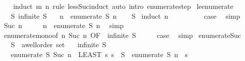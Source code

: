 \begin{isabellebody}
%
\isadelimproof
\ \ %
\endisadelimproof
%
\isatagproof
{}\isamarkupfalse%
\ {\isacharparenleft}induct\ m\ n\ rule{\isacharcolon}\ less{\isacharunderscore}Suc{\isacharunderscore}induct{\isacharparenright}\ {\isacharparenleft}auto\ intro{\isacharcolon}\ enumerate{\isacharunderscore}step{\isacharparenright}%
\endisatagproof
{\isafoldproof}%
%
\isadelimproof
\isanewline
%
\endisadelimproof
\isanewline
{}\isamarkupfalse%
\ le{\isacharunderscore}enumerate{\isacharcolon}\isanewline
\ \ \ S{\isacharcolon}\ {\isachardoublequoteopen}infinite\ S{\isachardoublequoteclose}\isanewline
\ \ \ {\isachardoublequoteopen}n\ {\isasymle}\ enumerate\ S\ n{\isachardoublequoteclose}\isanewline
%
\isadelimproof
\ \ %
\endisadelimproof
%
\isatagproof
{}\isamarkupfalse%
\ S\isanewline
{}\isamarkupfalse%
\ {\isacharparenleft}induct\ n{\isacharparenright}\isanewline
\ \ \isamarkupfalse%
\ {}\isanewline
\ \ \isamarkupfalse%
\ \isamarkupfalse%
\ {\isacharquery}case\ \isamarkupfalse%
\ simp\isanewline
{}\isamarkupfalse%
\isanewline
\ \ \isamarkupfalse%
\ {\isacharparenleft}Suc\ n{\isacharparenright}\isanewline
\ \ \isamarkupfalse%
\ \isamarkupfalse%
\ {\isachardoublequoteopen}n\ {\isasymle}\ enumerate\ S\ n{\isachardoublequoteclose}\ \isamarkupfalse%
\ simp\isanewline
\ \ \isamarkupfalse%
\ \isamarkupfalse%
\ enumerate{\isacharunderscore}mono{\isacharbrackleft}of\ n\ {\isachardoublequoteopen}Suc\ n{\isachardoublequoteclose}{\isacharcomma}\ OF\ {\isacharunderscore}\ {\isacartoucheopen}infinite\ S{\isacartoucheclose}{\isacharbrackright}\isanewline
\ \ \isamarkupfalse%
\ \isamarkupfalse%
\ {\isacharquery}case\ \isamarkupfalse%
\ simp\isanewline
{}\isamarkupfalse%
%
\endisatagproof
{\isafoldproof}%
%
\isadelimproof
\isanewline
%
\endisadelimproof
\isanewline
{}\isamarkupfalse%
\ enumerate{\isacharunderscore}Suc{\isacharprime}{\isacharprime}{\isacharcolon}\isanewline
\ \ \ S\ {\isacharcolon}{\isacharcolon}\ {\isachardoublequoteopen}{\isacharprime}a{\isacharcolon}{\isacharcolon}wellorder\ set{\isachardoublequoteclose}\isanewline
\ \ \ {\isachardoublequoteopen}infinite\ S{\isachardoublequoteclose}\isanewline
\ \ \ {\isachardoublequoteopen}enumerate\ S\ {\isacharparenleft}Suc\ n{\isacharparenright}\ {\isacharequal}\ {\isacharparenleft}LEAST\ s{\isachardot}\ s\ {\isasymin}\ S\ {\isasymand}\ enumerate\ S\ n\ {\isacharless}\ s{\isacharparenright}{\isachardoublequoteclose}\isanewline

\end{isabellebody}
